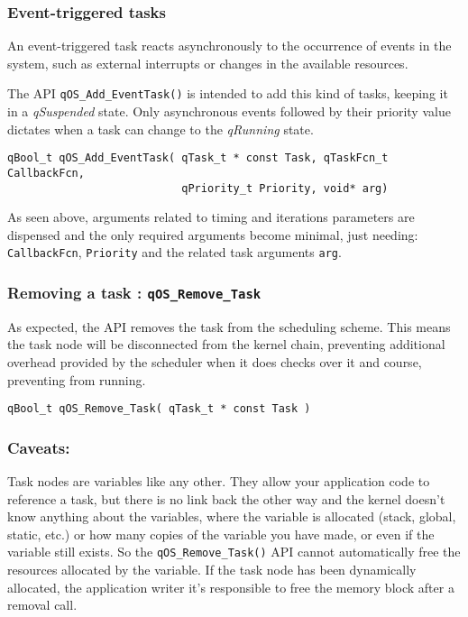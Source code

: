 \subsubsection{Event-triggered tasks}
An event-triggered task reacts asynchronously to the occurrence of events in the system, such as external interrupts or changes in the available resources. 

The API \lstinline{qOS_Add_EventTask()}  is intended to add this kind of tasks, keeping it in a \textit{qSuspended} state. Only asynchronous events followed by their priority value dictates when a task can change to the \textit{qRunning} state. 
\medskip


\begin{lstlisting}[style=CStyle]
qBool_t qOS_Add_EventTask( qTask_t * const Task, qTaskFcn_t CallbackFcn, 
                           qPriority_t Priority, void* arg)
\end{lstlisting}

As seen above, arguments related to timing and iterations parameters are dispensed and the only required arguments become minimal, just needing:  \lstinline{CallbackFcn}, \lstinline{Priority} and the related task arguments \lstinline{arg}.

\subsubsection{Removing a task : \lstinline{qOS_Remove_Task}}
As expected, the API removes the task from the scheduling scheme.  This means the task node will be disconnected from the kernel chain, preventing additional overhead provided by the scheduler when it does checks over it and course, preventing from running. 
\medskip

\begin{lstlisting}[style=CStyle]
qBool_t qOS_Remove_Task( qTask_t * const Task )
\end{lstlisting}

\subsubsection*{Caveats:}
Task nodes are variables like any other. They allow your application code to reference a task, but there is no link back the other way and the kernel doesn't know anything about the variables, where the variable is allocated (stack, global, static, etc.) or how many copies of the variable you have made, or even if the variable still exists.  So the \lstinline{qOS_Remove_Task()} API cannot automatically free the resources allocated by the variable. 
If the task node has been dynamically allocated, the application writer it's responsible to free the memory block after a removal call.


